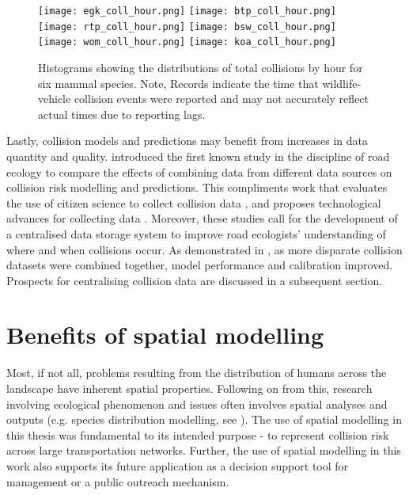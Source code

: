 \begin{figure*}[htp]
  \centering
	\begin{minipage}[t]{.9\textwidth}
    	\centering
    	\texttt{[image: egk\_coll\_hour.png]}\hspace{.05\textwidth}
    	\texttt{[image: btp\_coll\_hour.png]}\\ 
    	\texttt{[image: rtp\_coll\_hour.png]}\hspace{.05\textwidth}
    	\texttt{[image: bsw\_coll\_hour.png]}\\
    	\texttt{[image: wom\_coll\_hour.png]}\hspace{.05\textwidth}
    	\texttt{[image: koa\_coll\_hour.png]}
    \end{minipage}
  \caption[Total collisions by hour for six mammal species]{Histograms showing the distributions of total collisions by hour for six mammal species. Note, Records indicate the time that wildlife-vehicle collision events were reported and may not accurately reflect actual times due to reporting lags.}
  \label{temporal_all}
\end{figure*}

Lastly, collision models and predictions may benefit from increases in data quantity and quality.  introduced the first known study in the discipline of road ecology to compare the effects of combining data from different data sources on collision risk modelling and predictions. This compliments work that evaluates the use of citizen science to collect collision data \citep{paul14, dwye16}, and proposes technological advances for collecting data \citep{olso14}. Moreover, these studies call for the development of a centralised data storage system to improve road ecologists' understanding of where and when collisions occur. As demonstrated in , as more disparate collision datasets were combined together, model performance and calibration improved. Prospects for centralising collision data are discussed in a subsequent section. 

\section{Benefits of spatial modelling}

Most, if not all, problems resulting from the distribution of humans across the landscape have inherent spatial properties. Following on from this, research involving ecological phenomenon and issues often involves spatial analyses and outputs (e.g. species distribution modelling, see \cite{elit09}). The use of spatial modelling in this thesis was fundamental to its intended purpose - to represent collision risk across large transportation networks. Further, the use of spatial modelling in this work also supports its future application as a decision support tool for management or a public outreach mechanism.

